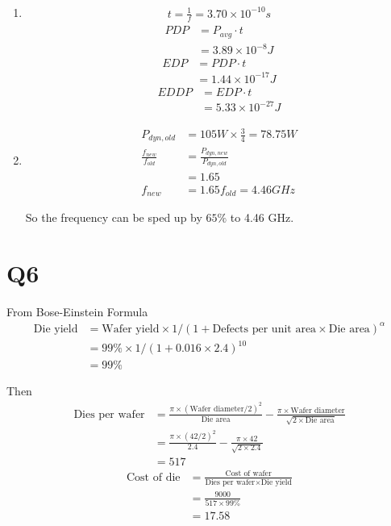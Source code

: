 \documentclass[12pt]{article}
\begin{document}
\begin{enumerate}
	\item 
	\begin{align*}
		t = \frac{1}{f} = 3.70 \times 10^{-10} s
	\end{align*}
	\begin{align*}
		PDP &= P_{avg} \cdot t\\
		&= 3.89 \times 10^{-8} J
	\end{align*}
	\begin{align*}
		EDP &= PDP \cdot t\\
		&= 1.44 \times 10^{-17} J
	\end{align*}
	\begin{align*}
		EDDP &= EDP \cdot t\\
		&= 5.33 \times 10^{-27} J
	\end{align*}
	\item 
	\begin{align*}
		P_{dyn,old} &= 105W \times \frac{3}{4} = 78.75W\\
		\frac{f_{new}}{f_{old}} &= \frac{P_{dyn,new}}{P_{dyn,old}}\\
		&= 1.65\\
		f_{new} &= 1.65 f_{old} = 4.46GHz
	\end{align*}

	So the frequency can be sped up by $65\%$ to 4.46 GHz.
\end{enumerate}

\section*{Q6}

From Bose-Einstein Formula
\begin{align*}
	\text{Die yield} &= \text{Wafer yield} \times 1/(1+\text{Defects per unit area} \times \text{Die area})^{\alpha}\\
	&= 99\% \times 1/(1+0.016 \times 2.4)^{10}\\
	&= 99\%
\end{align*}

Then
\begin{align*}
	\text{Dies per wafer} &= \frac{\pi \times (\text{Wafer diameter}/2)^2}{\text{Die area}}
		- \frac{\pi \times \text{Wafer diameter}}{\sqrt{2\times \text{Die area}}}\\
	&= \frac{\pi \times (42/2)^2}{2.4}
		- \frac{\pi \times 42}{\sqrt{2\times 2.4}}\\
	&= 517
\end{align*}
\begin{align*}
	\text{Cost of die} &= \frac{\text{Cost of wafer}}{\text{Dies per wafer} \times \text{Die yield}}\\
	&= \frac{9000}{517 \times 99\%}\\
	&= 17.58
\end{align*}
\end{document}
